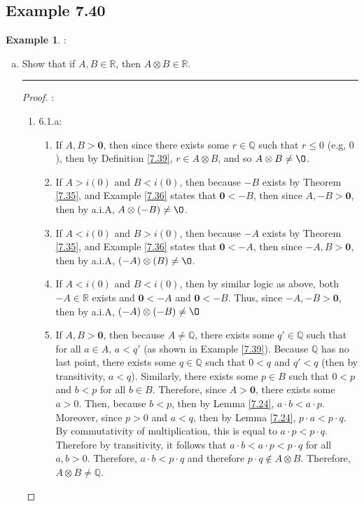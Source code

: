 \documentclass[openany, amssymb, psamsfonts]{amsart}
\newcommand{\bbQ}{\mathbb{Q}}
\newcommand{\bbR}{\mathbb{R}}
\renewcommand{\emptyset}{\O}
\theoremstyle{definition}
\newtheorem{exmp}{Example}[section]
\numberwithin{equation}{section}
\begin{document}
\subsection*{Example 7.40}
\begin{exmp}
\label{7.40}:\\
	\begin{enumerate}[(a)]
		\item Show that if $A, B \in \bbR$, then $A \otimes B \in \bbR$.
\vspace{4pt}     \hrule   \vspace{4pt}
\begin{proof}:\\
\begin{enumerate}
\item 6.1.a:
            \begin{enumerate}
            \item If $A,B > \textbf{0}$, then since there exists some $r\in \bbQ$ such that $r\leq 0$ (e.g, $0$), then by Definition \ref{7.39}, $r\in A\otimes B$, and so $A\otimes B \neq \emptyset$. 
            \item If $A > i(0)$ and $B<i(0)$, then because $-B$ exists by Theorem \ref{7.35}, and Example \ref{7.36} states that $\textbf{0}<-B$, then since $A,-B > \textbf{0}$, then by a.i.A, $A \otimes (-B) \neq \emptyset$. 
            \item If $A < i(0)$ and $B>i(0)$, then because $-A$ exists by Theorem \ref{7.35}, and Example \ref{7.36} states that $\textbf{0}<-A$, then since $-A,B > \textbf{0}$, then by a.i.A, $(-A) \otimes (B) \neq \emptyset$.
            \item If $A < i(0)$ and $B<i(0)$, then by similar logic as above, both $-A\in \bbR$ exists and $\textbf{0}<-A$ and $\textbf{0}<-B$. Thus, since $-A,-B > \textbf{0}$, then by 
            a.i.A, $(-A)\otimes (-B) \neq \emptyset$
        \item If $A,B > \textbf{0}$, then because $A\neq \bbQ$, there exists some $q'\in \bbQ$ such that for all $a\in A$, $a<q'$ (as shown in Example \ref{7.39}). Because $\bbQ$ has no last point, there exists some $q\in \bbQ$ such that $0< q$ and $q'<q$ (then by transitivity, $a<q$). Similarly, there exists some $p\in B$ such that $0<p$ and $b<p$ for all $b\in B$. Therefore, since $A> \textbf{0}$, there exists some $a>0$. Then, because $b<p$, then by Lemma \ref{7.24}, $a\cdot b < a\cdot p$. Moreover, since $p>0$ and $a<q$, then by Lemma \ref{7.24}, $p\cdot a < p\cdot q$. By commutativity of multiplication, this is equal to $a\cdot p<p\cdot q$. Therefore by transitivity, it follows that $a\cdot b < a\cdot p< p\cdot q$ for all $a,b>0$. Therefore, $a\cdot b<p\cdot q$ and therefore $p\cdot q \notin A\otimes B$. Therefore, $A\otimes B \neq \bbQ$.

\end{enumerate}
\end{enumerate}
\end{proof}
\end{enumerate}
\end{exmp}
\end{document}
